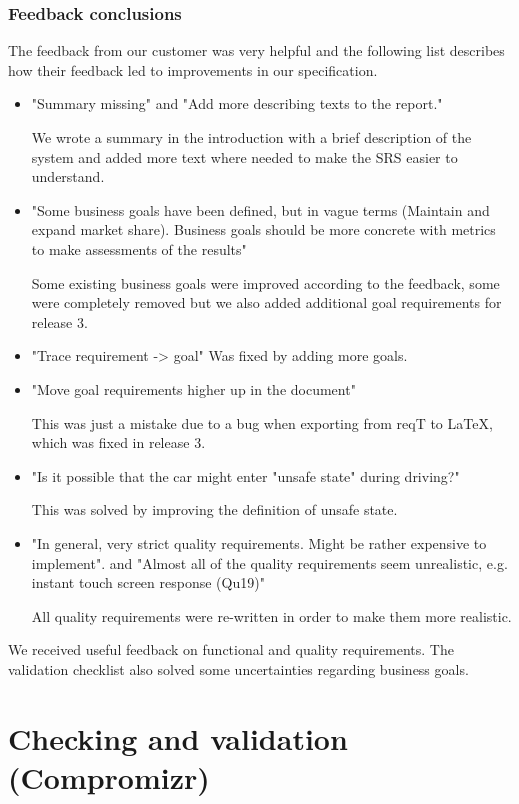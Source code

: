 \documentclass[10pt]{article}
\begin{document}
\subsubsection{Feedback conclusions}
The feedback from our customer was very helpful and the following list describes how their feedback led to improvements in our specification.
\begin{itemize}
\item "Summary missing" and "Add more describing texts to the report." 

We wrote a summary in the introduction with a brief description of the system and added more text where needed to make the SRS easier to understand.
\item "Some business goals have been defined, but in vague terms (Maintain and expand market share). Business goals should be more concrete with metrics to make assessments of the results"

Some existing business goals were improved according to the feedback, some were completely removed but we also added additional goal requirements for release 3.
\item "Trace requirement -> goal" 
Was fixed by adding more goals.
\item "Move goal requirements higher up in the document" 

This was just a mistake due to a bug when exporting from reqT to LaTeX, which was fixed in release 3.
\item "Is it possible that the car might enter "unsafe state" during driving?" 

This was solved by improving the definition of unsafe state.
\item "In general, very strict quality requirements. Might be rather expensive to implement". and "Almost all of the quality requirements seem unrealistic, e.g. instant touch screen response (Qu19)"

All quality requirements were re-written in order to make them more realistic.
\end{itemize}

\noindent We received useful feedback on functional and quality requirements. The validation checklist also solved some uncertainties regarding business goals.

\section{Checking and validation (Compromizr)}
\end{document}
